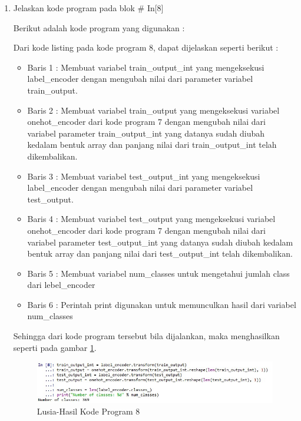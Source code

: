 \begin{enumerate}
\item Jelaskan kode program pada blok \# In[8]
	\par Berikut adalah kode program yang digunakan :
	
	\par Dari kode listing pada kode program 8, dapat dijelaskan seperti berikut :
	\begin{itemize}
	\item Baris 1	: Membuat variabel train\_output\_int yang mengeksekusi label\_encoder dengan mengubah nilai dari parameter variabel train\_output.
	\item Baris 2	: Membuat variabel train\_output yang mengeksekusi variabel onehot\_encoder dari kode program 7 dengan mengubah nilai dari variabel parameter train\_output\_int yang datanya sudah diubah kedalam bentuk array dan panjang nilai dari train\_output\_int telah dikembalikan.
	\item Baris 3	: Membuat variabel test\_output\_int yang mengeksekusi label\_encoder dengan mengubah nilai dari parameter variabel test\_output.
	\item Baris 4	: Membuat variabel test\_output yang mengeksekusi variabel onehot\_encoder dari kode program 7 dengan mengubah nilai dari variabel parameter test\_output\_int yang datanya sudah diubah kedalam bentuk array dan panjang nilai dari test\_output\_int telah dikembalikan.
	\item Baris 5	: Membuat variabel num\_classes untuk mengetahui jumlah class dari lebel\_encoder
	\item Baris 6	: Perintah print digunakan untuk memunculkan hasil dari variabel num\_classes
	\end{itemize}
	\par Sehingga dari kode program tersebut bila dijalankan, maka menghasilkan seperti pada gambar \ref{7B8}.
		\begin{figure}[!hbtp]
		\centering
		\includegraphics[scale=0.5]{figures/w8.jpg}
		\caption{Lusia-Hasil Kode Program 8}
		\label{7B8}
		\end{figure}
		

\end{enumerate}
